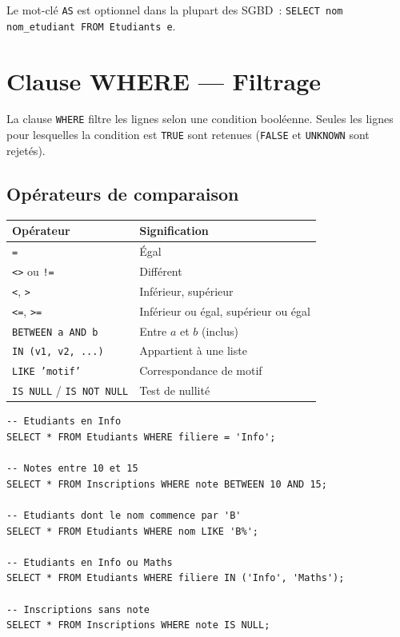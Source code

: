 Le mot-cl\'e \texttt{AS} est optionnel dans la plupart des SGBD~:
\texttt{SELECT nom nom\_etudiant FROM Etudiants e}.

\section{Clause WHERE --- Filtrage}

\begin{definition}
La clause \texttt{WHERE} filtre les lignes selon une condition bool\'eenne.
Seules les lignes pour lesquelles la condition est \texttt{TRUE} sont retenues
(\texttt{FALSE} et \texttt{UNKNOWN} sont rejet\'es).
\end{definition}

\subsection{Op\'erateurs de comparaison}

\begin{formules}[title=\textbf{Op\'erateurs de comparaison SQL}]
\begin{center}
\begin{tabular}{ll}
\toprule
\textbf{Op\'erateur} & \textbf{Signification} \\
\midrule
\texttt{=} & \'Egal \\
\texttt{<>} ou \texttt{!=} & Diff\'erent \\
\texttt{<}, \texttt{>} & Inf\'erieur, sup\'erieur \\
\texttt{<=}, \texttt{>=} & Inf\'erieur ou \'egal, sup\'erieur ou \'egal \\
\texttt{BETWEEN a AND b} & Entre $a$ et $b$ (inclus) \\
\texttt{IN (v1, v2, ...)} & Appartient \`a une liste \\
\texttt{LIKE 'motif'} & Correspondance de motif \\
\texttt{IS NULL} / \texttt{IS NOT NULL} & Test de nullit\'e \\
\bottomrule
\end{tabular}
\end{center}
\end{formules}

\begin{codeblock}[title=\textbf{Exemples de filtrage}]
\begin{verbatim}
-- Etudiants en Info
SELECT * FROM Etudiants WHERE filiere = 'Info';

-- Notes entre 10 et 15
SELECT * FROM Inscriptions WHERE note BETWEEN 10 AND 15;

-- Etudiants dont le nom commence par 'B'
SELECT * FROM Etudiants WHERE nom LIKE 'B%';

-- Etudiants en Info ou Maths
SELECT * FROM Etudiants WHERE filiere IN ('Info', 'Maths');

-- Inscriptions sans note
SELECT * FROM Inscriptions WHERE note IS NULL;
\end{verbatim}
\end{codeblock}

